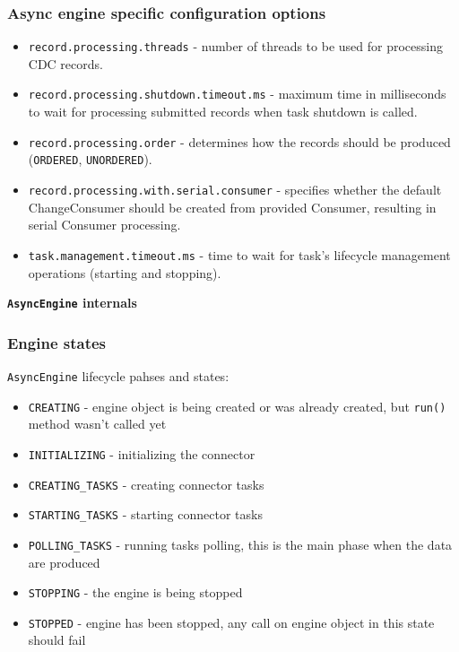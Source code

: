 \documentclass[10pt,utf8]{beamer}
\begin{document}
\begin{frame}
    \frametitle{Async engine specific configuration options}
    \begin{itemize}
        \item \texttt{record.processing.threads} - number of threads to be used for processing CDC records.
        \item \texttt{record.processing.shutdown.timeout.ms} - maximum time in milliseconds to wait for processing submitted records when task shutdown is called.
        \item \texttt{record.processing.order} - determines how the records should be produced (\texttt{ORDERED}, \texttt{UNORDERED}).
        \item \texttt{record.processing.with.serial.consumer} - specifies whether the default ChangeConsumer should be created from provided Consumer, resulting in serial Consumer processing.
        \item \texttt{task.management.timeout.ms} - time to wait for task's lifecycle management operations (starting and stopping).
    \end{itemize}
\end{frame}

\begin{frame}
    \centering
    \huge{\textbf{\texttt{AsyncEngine} internals}}
\end{frame}

\begin{frame}
    \frametitle{Engine states}
    \texttt{AsyncEngine} lifecycle pahses and states:
    \begin{itemize}
        \item \texttt{CREATING} - engine object is being created or was already created, but \texttt{run()} method wasn't called yet
        \item \texttt{INITIALIZING} - initializing the connector
        \item \texttt{CREATING\_TASKS} - creating connector tasks
        \item \texttt{STARTING\_TASKS} - starting connector tasks
        \item \texttt{POLLING\_TASKS} - running tasks polling, this is the main phase when the data are produced
        \item \texttt{STOPPING} - the engine is being stopped
        \item \texttt{STOPPED} - engine has been stopped, any call on engine object in this state should fail
    \end{itemize}
\end{frame}
\end{document}
